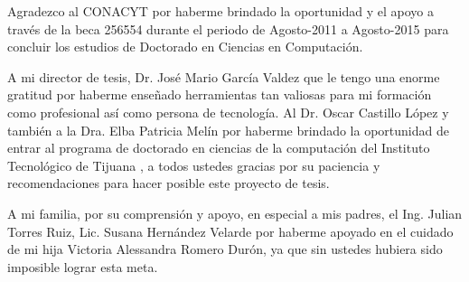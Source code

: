 
 Agradezco al CONACYT por haberme brindado la
oportunidad y el apoyo a trav\'es de la beca 256554 durante el periodo de
Agosto-2011 a Agosto-2015 para concluir los estudios de Doctorado en Ciencias en
Computaci\'on.

A mi director de tesis, Dr. Jos\'e Mario Garc\'ia Valdez  que le tengo una
enorme gratitud por haberme ense\~nado herramientas tan valiosas para mi
formaci\'on como profesional as\'i como persona de tecnolog\'ia. Al Dr. Oscar
Castillo L\'opez y tambi\'en a la Dra. Elba Patricia Mel\'in por haberme
brindado la oportunidad de entrar al programa de doctorado en ciencias de la
computaci\'on del Instituto Tecnol\'ogico de Tijuana , a todos ustedes gracias
por su paciencia y recomendaciones para hacer posible este proyecto de tesis.


A mi familia, por su comprensi\'on y apoyo, en especial a mis padres, el Ing.
Julian Torres Ruiz, Lic. Susana Hern\'andez Velarde por haberme apoyado en el
cuidado de mi hija Victoria Alessandra Romero Dur\'on, ya que sin ustedes hubiera
sido imposible lograr esta meta.



\textit{}
